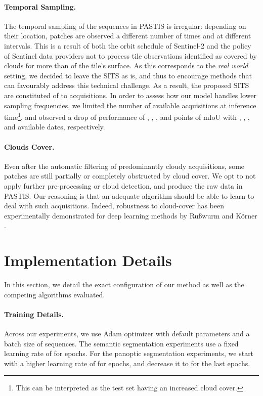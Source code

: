 \paragraph{Temporal Sampling.} The temporal sampling of the sequences in PASTIS is irregular: depending on their location, patches are observed a different number of times and at different intervals.
This is a result of both the orbit schedule of Sentinel-2 and the policy of Sentinel data providers not to process tile observations identified as covered by clouds for more than  of the tile's surface.
As this corresponds to the \emph{real world} setting, we decided to leave the SITS as is, and thus to encourage methods that can favourably address this technical challenge. As a result, the proposed SITS are constituted of  to  acquisitions.
In order to assess how our model handles lower sampling frequencies, we limited the number of available acquisitions at inference time\footnote{This can be interpreted as the test set having an increased cloud cover.}, and observed a  drop of performance of , , , and  points of mIoU with , , , and  available dates, respectively.

\paragraph{Clouds Cover. } Even after the automatic filtering of predominantly cloudy acquisitions, some patches are still partially or completely obstructed by cloud cover. We opt to not apply further pre-processing or cloud detection, and produce the raw data in PASTIS. Our reasoning is that an adequate algorithm should be able to learn to deal with such acquisitions. Indeed, robustness to cloud-cover has been experimentally demonstrated for deep learning methods by Ru{\ss}wurm and K\"orner \cite{russwurm2018convolutional, russwurm2020self}.
\section{Implementation Details}
In this section, we detail the exact configuration of our method as well as the competing algorithms evaluated.

\paragraph{Training Details.} 
Across our experiments, we use Adam \cite{kingma2014adam} optimizer with default parameters and a batch size of  sequences. The semantic segmentation experiments use a fixed learning rate of  for  epochs. For the panoptic segmentation experiments, we start with a higher learning rate of  for  epochs, and decrease it to  for the last  epochs.

